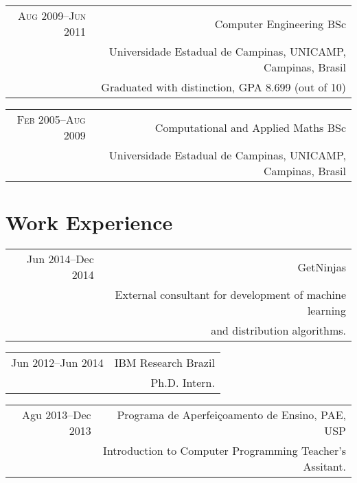 \documentclass[a4paper,10pt]{article}
\begin{document}
\begin{tabularx}{\textwidth}{D|R}
\textsc{Aug 2009--Jun 2011}  & Computer Engineering BSc\\
                            & Universidade Estadual de Campinas, UNICAMP, Campinas, Brasil\\
                            & \footnotesize Graduated with distinction, GPA 8.699 (out of 10)\\
\end{tabularx}

\begin{tabularx}{\textwidth}{D|R}
\textsc{Feb 2005--Aug 2009}  & Computational and Applied Maths BSc\\
                            & Universidade Estadual de Campinas, UNICAMP, Campinas, Brasil\\
\end{tabularx}


\section{Work Experience}

\begin{tabularx}{\textwidth}{D|R}
Jun 2014--Dec 2014    & GetNinjas\\
                    & \footnotesize External consultant for development of machine learning\\
                    & \footnotesize and distribution algorithms.\\
\end{tabularx}

\begin{tabularx}{\textwidth}{D|R}
Jun 2012--Jun 2014   & IBM Research Brazil\\
                    & \footnotesize Ph.D. Intern.\\
\end{tabularx}

\begin{tabularx}{\textwidth}{D|R}
Agu 2013--Dec 2013   & Programa de Aperfeiçoamento de Ensino, PAE, USP\\
                    & \footnotesize Introduction to Computer Programming Teacher’s Assitant.\\
\end{tabularx}
\end{document}
